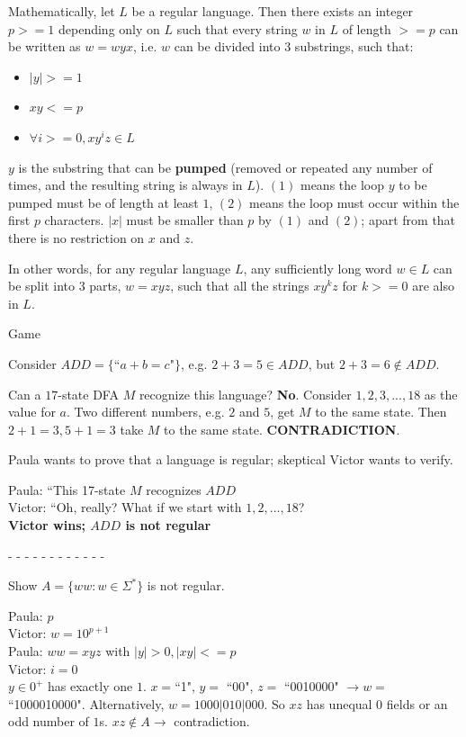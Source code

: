 \documentclass[2pt]{scrartcl}
\makeatletter
\renewcommand{\subsubsection}{\@startsection{subsubsection}{3}{0mm}
  {-1ex plus -.5ex minus -.2ex}
  {1ex plus .2ex}
{\normalfont\small\bfseries}}
\makeatother
\begin{document}
\begin{multicols}{6}
  Mathematically, let $L$ be a regular language. Then there exists an integer $p >= 1$ depending only on $L$ such that every string $w$ in $L$ of length $>= p$ can be written as $w = wyx$, i.e. $w$ can be divided into 3 substrings, such that:

  \begin{itemize}
    \item $|y| >= 1$
    \item $xy <= p$
    \item $\forall i >= 0, xy^iz \in L$
  \end{itemize}

  $y$ is the substring that can be {\bf pumped} (removed or repeated any number of times, and the resulting string is always in $L$). $(1)$ means the loop $y$ to be pumped must be of length at least $1$, $(2)$ means the loop must occur within the first $p$ characters. $|x|$ must be smaller than $p$ by $(1)$ and $(2)$; apart from that there is no restriction on $x$ and $z$.

  In other words, for any regular language $L$, any sufficiently long word $w \in L$ can be split into $3$ parts, $w = xyz$, such that all the strings $xy^kz$ for $k >= 0$ are also in $L$.

  \subsubsection{Game}

  Consider $ADD = \{$``$a + b = c$"$\}$, e.g. $2 + 3 = 5 \in ADD$, but $2 + 3 = 6 \notin ADD$.

  Can a $17$-state DFA $M$ recognize this language? {\bf No}. Consider $1, 2, 3, ..., 18$ as the value for $a$. Two different numbers, e.g. $2$ and $5$, get $M$ to the same state. Then $2 + 1 = 3, 5 + 1 = 3$ take $M$ to the same state. {\bf CONTRADICTION}.

  Paula wants to prove that a language is regular; skeptical Victor wants to verify.

  Paula: ``This 17-state $M$ recognizes $ADD$\\
  Victor: ``Oh, really? What if we start with $1, 2, ..., 18$?\\
  {\bf Victor wins; $ADD$ is not regular}

  - - - - - - - - - - - - 

  Show $A = \{ww: w \in \Sigma^*\}$ is not regular.

  Paula: $p$\\
  Victor: $w = 10^{p+1}$\\
  Paula: $ww = xyz$ with $|y| > 0, |xy| <= p$\\
  Victor: $i = 0$\\
  $y \in 0^+$ has exactly one $1$. $x = $``1", $y =$ ``00", $z =$ ``0010000" $\rightarrow w =$ ``1000010000". Alternatively, $w = 1000|010|000$. So $xz$ has unequal $0$ fields or an odd number of $1$s. $xz \notin A \rightarrow$ contradiction.


\end{multicols}
\end{document}
